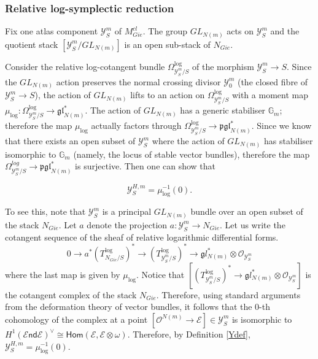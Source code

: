\documentclass[11pt]{amsart}
\newcommand {\Hom} {\mathsf{Hom}}
\newcommand {\End} {\mathcal E\mathsf{nd}}
\theoremstyle{plain}
\numberwithin{equation}{section}
\theoremstyle{definition}
\theoremstyle{plain}
\begin{document}
\medskip

\subsubsection{\textbf{Relative log-symplectic reduction}}\label{Reduc} Fix one atlas component $\mathcal Y^m_S$ of $M^{cl}_{Gie}$. The group $GL_{N(m)}$ acts on $\mathcal Y^m_S$ and the quotient stack $[\mathcal Y^m_S/GL_{N(m)}]$ is an open sub-stack of $N_{Gie}$. 

Consider the relative log-cotangent bundle $\Omega^{\log}_{\mathcal Y^m_S/S}$ of the morphism $\mathcal Y^m_S\to S$. Since the $GL_{N(m)}$ action preserves the normal crossing divisor $\mathcal Y^m_0$ (the closed fibre of $\mathcal Y^m_S\longrightarrow S$), the action of $GL_{N(m)}$ lifts to an action on $\Omega^{\log}_{\mathcal Y^m_S/S}$ with a moment map $\mu_{\log}: \Omega^{\log}_{\mathcal Y^m_S/S}\longrightarrow \mathfrak{gl}_{N(m)}^*$. The action of $GL_{N(m)}$ has a generic stabiliser $\mathbb G_m$; therefore the map $\mu_{\log}$ actually factors through $\Omega^{\log}_{\mathcal Y^m_S/S}\longrightarrow \mathfrak{pgl}_{N(m)}^*$. Since we know that there exists an open subset of $\mathcal Y^m_S$ where the action of $GL_{N(m)}$ has stabiliser isomorphic to $\mathbb G_m$ (namely, the locus of stable vector bundles), therefore the map $\Omega^{log}_{\mathcal Y^m_S/S}\longrightarrow \mathfrak{pgl}_{N(m)}^*$ is surjective. Then one can show that 

\begin{equation}\label{qqq112}
    \mathcal Y^{H, m}_S=\mu_{\log}^{-1}(0).
\end{equation}

To see this, note that $\mathcal Y^m_S$ is a principal $GL_{N(m)}$ bundle over an open subset of the stack $N_{Gie}$. Let $a$ denote the projection $a: \mathcal Y^m_S\longrightarrow N_{Gie}$. Let us write the cotangent sequence of the sheaf of relative logarithmic differential forms. 
\begin{equation}
    0\longrightarrow a^*(T^{\log}_{N_{Gie}/S})^*\longrightarrow (T^{\log}_{\mathcal Y^m_S/S})^*\longrightarrow \mathfrak gl^*_{N(m)}\otimes \mathcal O_{\mathcal Y^m_S}
\end{equation}
where the last map is given by $\mu_{\log}$. Notice that $[(T^{\log}_{\mathcal Y^m_S/S})^*\longrightarrow \mathfrak gl^*_{N(m)}\otimes \mathcal O_{\mathcal Y^m_S}]$ is the cotangent complex of the stack $N_{Gie}$. Therefore, using standard arguments from the deformation theory of vector bundles, it follows that the $0$-th cohomology of the complex at a point $[\mathcal O^{N(m)}\rightarrow \mathcal E]\in \mathcal Y^m_S$ is isomorphic to $H^1(\End \mathcal E)^{\vee}\cong \Hom(\mathcal E, \mathcal E\otimes \omega)$. Therefore, by Definition \ref{Ydef}, $\mathcal Y^{H, m}_S=\mu_{\log}^{-1}(0)$. 
\end{document}
